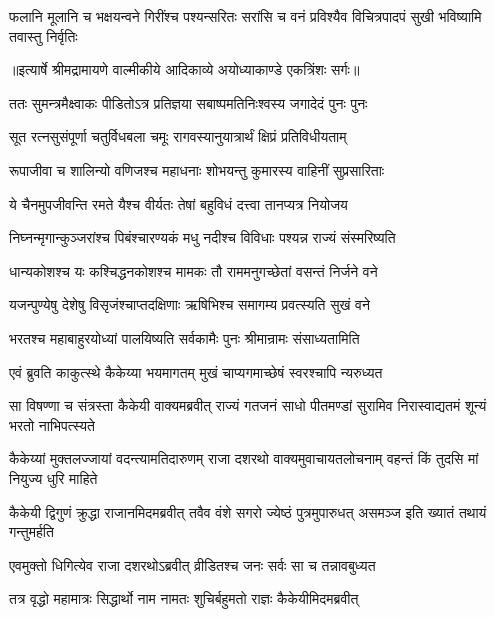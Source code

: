 \fourlineindentedshloka
{फलानि मूलानि च भक्षयन्वने}
{ गिरींश्च पश्यन्सरितः सरांसि च}
{वनं प्रविश्यैव विचित्रपादपं}
{ सुखी भविष्यामि तवास्तु निर्वृतिः} %


{॥इत्यार्षे श्रीमद्रामायणे वाल्मीकीये आदिकाव्ये अयोध्याकाण्डे एकत्रिंशः सर्गः॥}


\twolineshloka
{ततः सुमन्त्रमैक्ष्वाकः पीडितोऽत्र प्रतिज्ञया}
{सबाष्पमतिनिःश्वस्य जगादेदं पुनः पुनः} %

\twolineshloka
{सूत रत्नसुसंपूर्णा चतुर्विधबला चमूः}
{रागवस्यानुयात्रार्थं क्षिप्रं प्रतिविधीयताम्} %

\twolineshloka
{रूपाजीवा च शालिन्यो वणिजश्च महाधनाः}
{शोभयन्तु कुमारस्य वाहिनीं सुप्रसारिताः} %

\twolineshloka
{ये चैनमुपजीवन्ति रमते यैश्च वीर्यतः}
{तेषां बहुविधं दत्त्वा तानप्यत्र नियोजय} %

\twolineshloka
{निघ्नन्मृगान्कुञ्जरांश्च पिबंश्चारण्यकं मधु}
{नदीश्च विविधाः पश्यन्न राज्यं संस्मरिष्यति} %

\twolineshloka
{धान्यकोशश्च यः कश्चिद्धनकोशश्च मामकः}
{तौ राममनुगच्छेतां वसन्तं निर्जने वने} %

\twolineshloka
{यजन्पुण्येषु देशेषु विसृजंश्चाप्तदक्षिणाः}
{ऋषिभिश्च समागम्य प्रवत्स्यति सुखं वने} %

\twolineshloka
{भरतश्च महाबाहुरयोध्यां पालयिष्यति}
{सर्वकामैः पुनः श्रीमान्रामः संसाध्यतामिति} %

\twolineshloka
{एवं ब्रुवति काकुत्स्थे कैकेय्या भयमागतम्}
{मुखं चाप्यगमाच्छेषं स्वरश्चापि न्यरुध्यत} %

\threelineshloka
{सा विषण्णा च संत्रस्ता कैकेयी वाक्यमब्रवीत्}
{राज्यं गतजनं साधो पीतमण्डां सुरामिव}
{निरास्वाद्यतमं शून्यं भरतो नाभिपत्स्यते} %

\threelineshloka
{कैकेय्यां मुक्तलज्जायां वदन्त्यामतिदारुणम्}
{राजा दशरथो वाक्यमुवाचायतलोचनाम्}
{वहन्तं किं तुदसि मां नियुज्य धुरि माहिते} %

\threelineshloka
{कैकेयी द्विगुणं क्रुद्धा राजानमिदमब्रवीत्}
{तवैव वंशे सगरो ज्येष्ठं पुत्रमुपारुधत्}
{असमञ्ज इति ख्यातं तथायं गन्तुमर्हति} %

\twolineshloka
{एवमुक्तो धिगित्येव राजा दशरथोऽब्रवीत्}
{व्रीडितश्च जनः सर्वः सा च तन्नावबुध्यत} %

\twolineshloka
{तत्र वृद्धो महामात्रः सिद्धार्थो नाम नामतः}
{शुचिर्बहुमतो राज्ञः कैकेयीमिदमब्रवीत्} %

